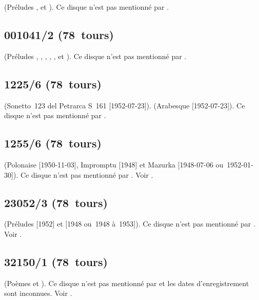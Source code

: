 \Chopin{} (Préludes  ,   et
 ).
Ce disque n'est pas mentionné par \INikonovich{}
\citep[voir][]{Nikonovich11}.

\subsection{001041/2 (78~tours)}

\Chopin{} (Préludes  ,  , 
,  ,  , 
 et  ).
Ce disque n'est pas mentionné par \INikonovich{}
\citep[voir][]{Nikonovich11}.

\subsection{1225/6 (78~tours)}

\Liszt{} (Sonetto~123 del Petrarca S~161  [1952-07-23]).
\Schumann{} (Arabesque  [1952-07-23]).
Ce disque n'est pas mentionné par \INikonovich{}
\citep[voir][]{Nikonovich11}.

\subsection{1255/6 (78~tours)}

\Scriabine{} (Polonaise  [1950-11-03], Impromptu 
 [1948] et Mazurka   [1948-07-06
ou~1952-01-30]).
Ce disque n'est pas mentionné par \INikonovich{}
\citep[voir][]{Nikonovich11}.
Voir \citet{Recordssu}.

\subsection{23052/3 (78~tours)}

\Scriabine{} (Préludes   [1952] et  
[1948 ou~1948 à~1953]).
Ce disque n'est pas mentionné par \INikonovich{}
\citep[voir][]{Nikonovich11}.
Voir \citet{Recordssu}.

\subsection{32150/1 (78~tours)}

\Scriabine{} (Poèmes   et  ).
Ce disque n'est pas mentionné par \INikonovich{}
\citep[voir][]{Nikonovich11} et les dates d'enregistrement sont inconnues.
Voir \citet{Recordssu}.

